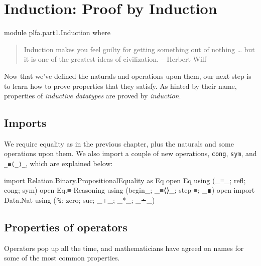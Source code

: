 \hypertarget{Induction}{%
\chapter{Induction: Proof by Induction}\label{Induction}}

\begin{fence}
\begin{code}
module plfa.part1.Induction where
\end{code}
\end{fence}

\begin{quote}
Induction makes you feel guilty for getting something out of nothing
\ldots{} but it is one of the greatest ideas of civilization. -- Herbert
Wilf
\end{quote}

Now that we've defined the naturals and operations upon them, our next
step is to learn how to prove properties that they satisfy. As hinted by
their name, properties of \emph{inductive datatypes} are proved by
\emph{induction}.

\hypertarget{imports}{%
\section{Imports}\label{imports}}

We require equality as in the previous chapter, plus the naturals and
some operations upon them. We also import a couple of new operations,
\texttt{cong}, \texttt{sym}, and \texttt{\_≡⟨\_⟩\_}, which are explained
below:

\begin{fence}
\begin{code}
import Relation.Binary.PropositionalEquality as Eq
open Eq using (_≡_; refl; cong; sym)
open Eq.≡-Reasoning using (begin_; _≡⟨⟩_; step-≡; _∎)
open import Data.Nat using (ℕ; zero; suc; _+_; _*_; _∸_)
\end{code}
\end{fence}

\hypertarget{properties-of-operators}{%
\section{Properties of operators}\label{properties-of-operators}}

Operators pop up all the time, and mathematicians have agreed on names
for some of the most common properties.

